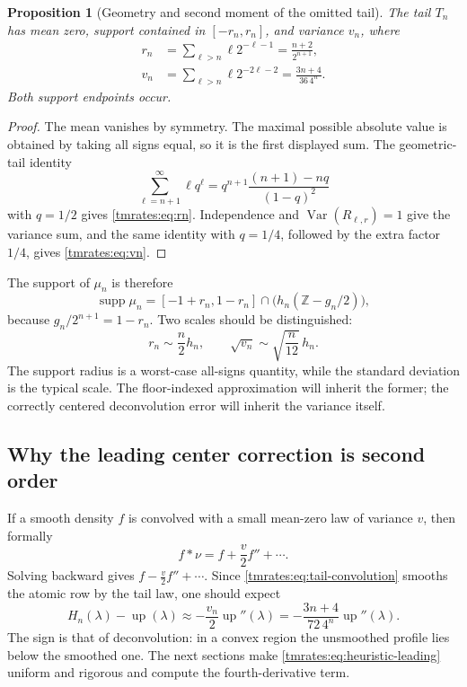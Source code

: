 \documentclass[11pt,oneside]{article}
\newtheorem{proposition}[proposition]{Proposition}
\theoremstyle{definition}
\theoremstyle{remark}
\newcommand{\Z}{\mathbb Z}
\newcommand{\Up}{\operatorname{up}}
\newcommand{\Var}{\operatorname{Var}}
\newcommand{\supp}{\operatorname{supp}}
\begin{document}
\begin{proposition}[Geometry and second moment of the omitted tail]
\label{tmrates:prop:tail-moments}
The tail $T_n$ has mean zero, support contained in $[-r_n,r_n]$, and variance $v_n$, where
\begin{align}
 r_n&=\sum_{\ell>n}\ell2^{-\ell-1}
     =\frac{n+2}{2^{n+1}},                                  \label{tmrates:eq:rn}\\
 v_n&=\sum_{\ell>n}\ell2^{-2\ell-2}
     =\frac{3n+4}{36\,4^n}.                                 \label{tmrates:eq:vn}
\end{align}
Both support endpoints occur.
\end{proposition}

\begin{proof}
The mean vanishes by symmetry.  The maximal possible absolute value is obtained by taking
all signs equal, so it is the first displayed sum.  The geometric-tail identity
\[
 \sum_{\ell=n+1}^{\infty}\ell q^\ell
 =q^{n+1}\frac{(n+1)-nq}{(1-q)^2}
\]
with $q=1/2$ gives \eqref{tmrates:eq:rn}.  Independence and $\Var(R_{\ell,r})=1$ give the variance
sum, and the same identity with $q=1/4$, followed by the extra factor $1/4$, gives
\eqref{tmrates:eq:vn}.
\end{proof}

The support of $\mu_n$ is therefore
\begin{equation}
 \supp\mu_n=[-1+r_n,1-r_n]\cap\bigl(h_n(\Z-g_n/2)\bigr),  \label{tmrates:eq:support-mun}
\end{equation}
because $g_n/2^{n+1}=1-r_n$.  Two scales should be distinguished:
\begin{equation}
 r_n\sim\frac n2h_n,
 \qquad
 \sqrt{v_n}\sim\sqrt{\frac n{12}}\,h_n.                  \label{tmrates:eq:two-tail-scales}
\end{equation}
The support radius is a worst-case all-signs quantity, while the standard deviation is the
typical scale.  The floor-indexed approximation will inherit the former; the correctly
centered deconvolution error will inherit the variance itself.

\subsection{Why the leading center correction is second order}

If a smooth density $f$ is convolved with a small mean-zero law of variance $v$, then formally
\[
 f*\nu=f+\frac v2f''+\cdots.
\]
Solving backward gives $f-\frac v2f''+\cdots$.  Since \eqref{tmrates:eq:tail-convolution} smooths the
atomic row by the tail law, one should expect
\begin{equation}
 H_n(\lambda)-\Up(\lambda)
 \approx-\frac{v_n}{2}\Up''(\lambda)
 =-\frac{3n+4}{72\,4^n}\Up''(\lambda).                    \label{tmrates:eq:heuristic-leading}
\end{equation}
The sign is that of deconvolution: in a convex region the unsmoothed profile lies below the
smoothed one.  The next sections make \eqref{tmrates:eq:heuristic-leading} uniform and rigorous and
compute the fourth-derivative term.
\end{document}
